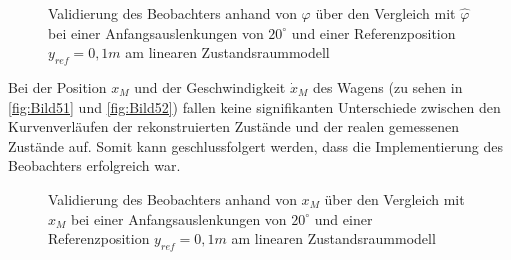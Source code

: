 \begin{figure}[H]
    \centering
    \caption[Vergleich $\varphi$, $\hat{\varphi}$]{Validierung des Beobachters anhand von $\varphi$ über den Vergleich mit $\hat{\varphi}$ bei einer Anfangsauslenkungen von $20^\circ$ und einer Referenzposition $y_{ref} = 0,1 m$ am linearen Zustandsraummodell}
    \label{fig:Bild50}
\end{figure}

Bei der Position $x_M$ und der Geschwindigkeit $\dot{x}_M$ des Wagens (zu sehen in \autoref{fig:Bild51} und \autoref{fig:Bild52}) fallen keine signifikanten Unterschiede zwischen den Kurvenverläufen der rekonstruierten Zustände und der realen \bzw gemessenen Zustände auf. Somit kann geschlussfolgert werden, dass die Implementierung des Beobachters erfolgreich war.

\begin{figure}[H]
    \centering
    \caption[Vergleich $x_M$, $\hat{x}_M$]{Validierung des Beobachters anhand von $x_M$ über den Vergleich mit $\hat{x}_M$ bei einer Anfangsauslenkungen von $20^\circ$ und einer Referenzposition $y_{ref} = 0,1 m$ am linearen Zustandsraummodell}
    \label{fig:Bild51}
\end{figure}

